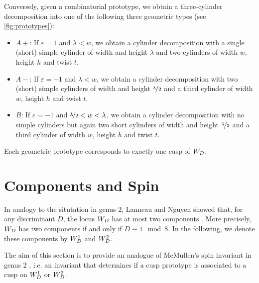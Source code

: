 \documentclass{amsart}
\makeatletter
\newcommand*{\@gobblenexttocentry}[9]{}
\newcommand*{\@gobblenexttocentry}[4]{}
\newcommand*{\addsubsection}{%
    \addtocontents{toc}{\protect\@gobblenexttocentry}%
    \subsection*}
\def\ep{\varepsilon}
\makeatother
\begin{document}
Conversely, given a combinatorial prototype, we obtain a three-cylinder decomposition into one of the following three geometric types (see \autoref{fig:prototypes}):
\begin{itemize}
\item $A+$: If $\ep=1$ and $\lambda<w$, we obtain a cylinder decomposition with a single (short) simple cylinder of width and height $\lambda$ and two cylinders of width $w$, height $h$ and twist $t$.
\item $A-$: If $\ep=-1$ and $\lambda<w$, we obtain a cylinder decomposition with two (short) simple cylinders of width and height $\nicefrac{\lambda}{2}$ and a third cylinder of width $w$, height $h$ and twist $t$.
\item $B$: If $\ep=-1$ and $\nicefrac{\lambda}{2}<w<\lambda$, we obtain a cylinder decomposition with no simple cylinders but again two short cylinders of width and height $\nicefrac{\lambda}{2}$ and a third cylinder of width $w$, height $h$ and twist $t$.
\end{itemize}
Each geometric prototype corresponds to exactly one cusp of $\W$.


\section{Components and Spin}
\label{componentsandspin}

In analogy to the situtation in genus $2$, Lanneau and Nguyen showed that, for any discriminant $D$, the locus $\W$ has at most two components \cite[Theorem 2.8, 2.10]{lanneaunguyen}. More precisely, $\W$ has two components if and only if $D\equiv 1\mod 8$. In the following, we denote these components by $\W^1$ and $\W^2$. 

The aim of this section is to provide an analogue of McMullen's spin invariant in genus $2$ \cite{mcmullenspin}, i.e. an invariant that determines if a cusp prototype is associated to a cusp on $\W^1$ or $\W^2$.
%
%
\end{document}
